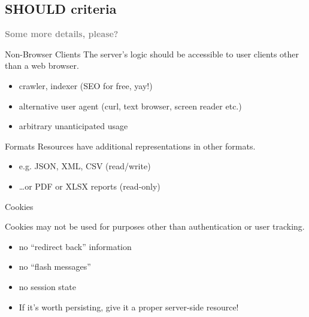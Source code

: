 \documentclass{beamer}
\begin{document}
\subsection{SHOULD criteria}

\begin{frame}
  \vspace*{-1cm}
  \textcolor{gray}{
    \begin{center}
      \textbf{
        \fontsize{60}{50}\selectfont Some more details, please?
      }
    \end{center}
  }
\end{frame}

\begin{frame}{Non-Browser Clients}
  The server's logic should be accessible to user clients other than a web browser.

  \begin{itemize}
    \item crawler, indexer (SEO for free, yay!)
    \item alternative user agent (curl, text browser, screen reader etc.)
    \item arbitrary unanticipated usage
  \end{itemize}
\end{frame}

\begin{frame}{Formats}
  Resources have additional representations in other formats.

  \begin{itemize}
    \item e.g. JSON, XML, CSV (read/write)
    \item \dots or PDF or XLSX reports (read-only)
  \end{itemize}
\end{frame}

\begin{frame}{Cookies}

  Cookies may not be used for purposes other than authentication or user tracking.

  \begin{itemize}
    \item no ``redirect back'' information
    \item no ``flash messages''
    \item no session state
    \item If it's worth persisting, give it a proper server-side resource!
  \end{itemize}
\end{frame}
\end{document}
